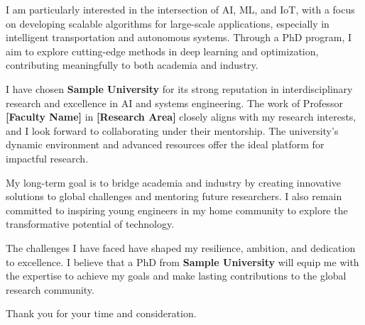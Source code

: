 \documentclass[11pt]{article}
\begin{document}
I am particularly interested in the intersection of AI, ML, and IoT, with a focus on developing scalable algorithms
for large-scale applications, especially in intelligent transportation and autonomous systems. Through a PhD program,
I aim to explore cutting-edge methods in deep learning and optimization, contributing meaningfully to both academia
and industry.

\ifshowsections{}\fi
\firstparagraph I have chosen \textbf{Sample University} for its strong reputation in interdisciplinary research and excellence
in AI and systems engineering. The work of Professor \textbf{[Faculty Name]} in \textbf{[Research Area]} closely aligns
with my research interests, and I look forward to collaborating under their mentorship. The university’s dynamic
environment and advanced resources offer the ideal platform for impactful research.

My long-term goal is to bridge academia and industry by creating innovative solutions to global challenges and
mentoring future researchers. I also remain committed to inspiring young engineers in my home community to explore
the transformative potential of technology.

\ifshowsections{}\fi
\firstparagraph The challenges I have faced have shaped my resilience, ambition, and dedication to excellence. I believe that a
PhD from \textbf{Sample University} will equip me with the expertise to achieve my goals and make lasting
contributions to the global research community.

\begin{flushleft}
    Thank you for your time and consideration.
\end{flushleft}
\end{document}
